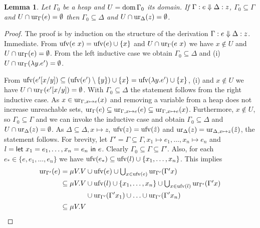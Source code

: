 \documentclass[preprint]{sigplanconf}
\newtheorem{lemma}[theorem]{Lemma}
\theoremstyle{nonumberplain}
\newtheorem{proof}{Proof}
\begin{document}
\begin{lemma}
Let $\Gamma_0$ be a heap and $U= \text{dom}\,\Gamma_0$ its domain. If $\Gamma : e \Downarrow \Delta : z$, $\Gamma_0 \subseteq \Gamma$ and $U \cap \text{ur}_{\Gamma}(e) = \emptyset$ then $\Gamma_0 \subseteq \Delta$ and  $U \cap \text{ur}_{\Delta}(z)=\emptyset$.
\label{lem:deepdup}
\end{lemma}
\begin{proof}
The proof is by induction on the structure of the derivation $\Gamma : e \Downarrow \Delta : z$.
Immediate.
From $\text{ufv}(e\ x) = \text{ufv}(e) \cup \{x\}$ and $U \cap \text{ur}_{\Gamma}(e\ x)$ we have $x\notin U$ and $U \cap \text{ur}_{\Gamma}(e) = \emptyset$. From the left inductive case we obtain $\Gamma_0 \subseteq \Delta$ and (i) $U \cap \text{ur}_{\Gamma}(\lambda y. e')= \emptyset$.

From $\text{ufv}(e'[x/y]) \subseteq (\text{ufv}(e')\setminus \{y\}) \cup \{x\} = \text{ufv}(\lambda y.e') \cup \{x\}$, (i) and $x\notin U$ we have $U \cap \text{ur}_{\Gamma}(e'[x/y]) = \emptyset$. With $\Gamma_0 \subseteq \Delta$ the statement follows from the right inductive case.
As $x \in \text{ur}_{\Gamma,x \mapsto e}(x)$ and removing a variable from a heap does not increase unreachable sets, $\text{ur}_{\Gamma}(e) \subseteq \text{ur}_{\Gamma, x\mapsto e}(e) \subseteq \text{ur}_{\Gamma,x\mapsto e}(x)$. Furthermore, $x \notin U$, so $\Gamma_0 \subseteq \Gamma$ and we can invoke the inductive case and obtain $\Gamma_0 \subseteq \Delta$ and $U \cap \text{ur}_{\Delta}(z) = \emptyset$. As $\Delta \subseteq \Delta, x \mapsto z$, $\text{ufv}(z) = \text{ufv}(\hat z)$ and $\text{ur}_{\Delta}(z) = \text{ur}_{\Delta, x \mapsto z}(\hat z)$, the statement follows.
For brevity, let $\Gamma' = \Gamma \subseteq \Gamma,x_1\mapsto e_1,\ldots,x_n\mapsto e_n$ and $l = \text{\textsf{let}}\ x_1=e_1,\ldots,x_n=e_n\ \text{\textsf{in}}\ e$.
Clearly $\Gamma_0 \subseteq \Gamma \subseteq \Gamma'$.
Also, for each $e_* \in \{e,e_1,\ldots,e_n\}$ we have $\text{ufv}(e_*) \subseteq \text{ufv}(l) \cup \{x_1,\ldots,x_n\}$. This implies 
\begin{align*}
\ur{\Gamma'}e
&= \mu V. V \cup \ufv e \cup \textstyle\bigcup_{x\in \ufv e}\ur{\Gamma'}{\Gamma' x} \\
&\subseteq \mu V. V
\begin{aligned}[t]
&\cup \ufv l \cup \{x_1,\ldots,x_n\} \cup \textstyle\bigcup_{x\in \ufv l}\ur{\Gamma'}{\Gamma' x} \\
&\cup \ur{\Gamma'}{\Gamma' x_1} \cup \ldots \cup \ur{\Gamma'}{\Gamma' x_n}
\end{aligned}\\
&\subseteq \mu V. V
\begin{aligned}[t]

\end{aligned}
\end{align*}
\end{proof}
\end{document}
